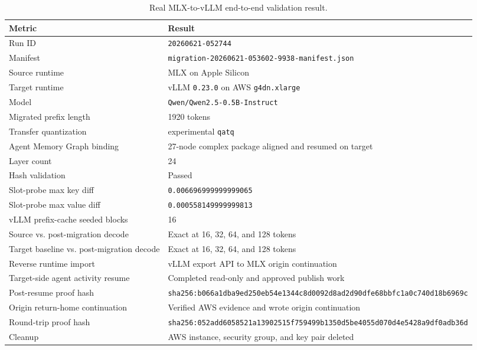 \documentclass[11pt]{article}
\begin{document}
\begin{table}[h]
\centering
\begin{tabular}{ll}
\toprule
Metric & Result \\
\midrule
Run ID & \texttt{20260621-052744} \\
Manifest & \texttt{migration-20260621-053602-9938-manifest.json} \\
Source runtime & MLX on Apple Silicon \\
Target runtime & vLLM \texttt{0.23.0} on AWS \texttt{g4dn.xlarge} \\
Model & \texttt{Qwen/Qwen2.5-0.5B-Instruct} \\
Migrated prefix length & 1920 tokens \\
Transfer quantization & experimental \texttt{qatq} \\
Agent Memory Graph binding & 27-node complex package aligned and resumed on target \\
Layer count & 24 \\
Hash validation & Passed \\
Slot-probe max key diff & \texttt{0.006696999999999065} \\
Slot-probe max value diff & \texttt{0.000558149999999813} \\
vLLM prefix-cache seeded blocks & 16 \\
Source vs. post-migration decode & Exact at 16, 32, 64, and 128 tokens \\
Target baseline vs. post-migration decode & Exact at 16, 32, 64, and 128 tokens \\
Reverse runtime import & vLLM export API to MLX origin continuation \\
Target-side agent activity resume & Completed read-only and approved publish work \\
Post-resume proof hash & \texttt{sha256:b066a1dba9ed250eb54e1344c8d0092d8ad2d90dfe68bbfc1a0c740d18b6969c} \\
Origin return-home continuation & Verified AWS evidence and wrote origin continuation \\
Round-trip proof hash & \texttt{sha256:052add6058521a13902515f759499b1350d5be4055d070d4e5428a9df0adb36d} \\
Cleanup & AWS instance, security group, and key pair deleted \\
\bottomrule
\end{tabular}
\caption{Real MLX-to-vLLM end-to-end validation result.}
\label{tab:e2e}
\end{table}
\end{document}
